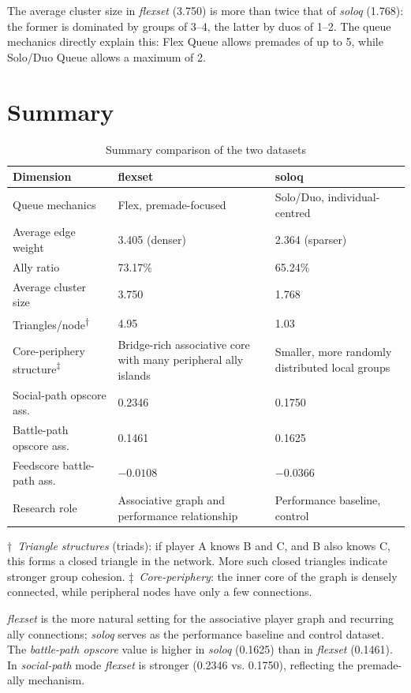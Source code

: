 The average cluster size in \textit{flexset} (3.750) is more than twice that of \textit{soloq} (1.768): the former is dominated by groups of 3--4, the latter by duos of 1--2. The queue mechanics directly explain this: Flex Queue allows premades of up to 5, while Solo/Duo Queue allows a maximum of 2.

\section{Summary}

\begin{table}[H]
\centering
\caption{Summary comparison of the two datasets}
\begin{tabularx}{\textwidth}{|>{\raggedright\arraybackslash}p{5cm}|X|X|}
\hline
\textbf{Dimension} & \textbf{flexset} & \textbf{soloq} \\
\hline
Queue mechanics & Flex, premade-focused & Solo/Duo, individual-centred \\
Average edge weight & 3.405 (denser) & 2.364 (sparser) \\
Ally ratio & 73.17\% & 65.24\% \\
Average cluster size & 3.750 & 1.768 \\
Triangles/node\textsuperscript{†} & 4.95 & 1.03 \\
Core-periphery structure\textsuperscript{‡} & Bridge-rich associative core with many peripheral ally islands & Smaller, more randomly distributed local groups \\
Social-path opscore ass. & 0.2346 & 0.1750 \\
Battle-path opscore ass. & 0.1461 & 0.1625 \\
Feedscore battle-path ass. & $-0.0108$ & $-0.0366$ \\
Research role & Associative graph and performance relationship & Performance baseline, control \\
\hline
\end{tabularx}
\end{table}

\noindent\small{†~\textit{Triangle structures} (triads): if player A knows B and C, and B also knows C, this forms a closed triangle in the network. More such closed triangles indicate stronger group cohesion. \quad ‡~\textit{Core-periphery}: the inner core of the graph is densely connected, while peripheral nodes have only a few connections.}\normalsize

\medskip
\textit{flexset} is the more natural setting for the associative player graph and recurring ally connections; \textit{soloq} serves as the performance baseline and control dataset. The \textit{battle-path opscore} value is higher in \textit{soloq} (0.1625) than in \textit{flexset} (0.1461). In \textit{social-path} mode \textit{flexset} is stronger (0.2346 vs. 0.1750), reflecting the premade-ally mechanism.

